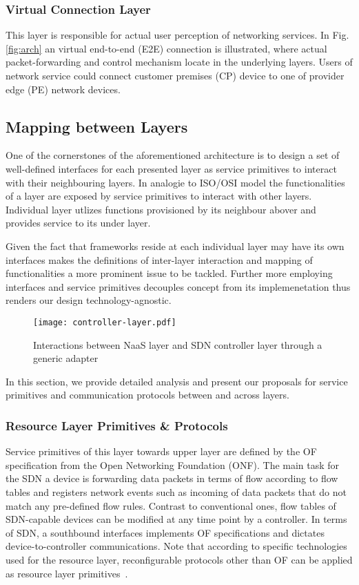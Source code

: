\subsubsection{Virtual Connection Layer} This layer is responsible for actual
user perception of networking services. In Fig.\ref{fig:arch} an virtual
end-to-end (E2E) connection is illustrated, where actual packet-forwarding and
control mechanism locate in the underlying layers. Users of network service
could connect customer premises (CP) device to one of provider edge (PE) network 
devices.


\subsection{Mapping between Layers}


One of the cornerstones of the aforementioned architecture is to design a set
of well-defined interfaces for each presented layer as service primitives to
interact with their neighbouring layers. In analogie to ISO/OSI model the
functionalities of a layer are exposed by service primitives to interact with
other layers. Individual layer utlizes functions provisioned by its neighbour
abover and provides service to its under layer.

Given the fact that frameworks reside at each individual layer may have its own
interfaces makes the definitions of inter-layer interaction and mapping of
functionalities a more prominent issue to be tackled. Further more employing interfaces 
and service primitives decouples concept from its implemenetation thus renders our 
design technology-agnostic. 

\begin{figure}[htp]
	\texttt{[image: controller-layer.pdf]}
	\label{fig:controller-layer}
	\caption{Interactions between NaaS layer and SDN controller layer through a generic adapter}
\end{figure}


In this section, we provide detailed analysis and present our proposals for
service primitives and communication protocols between and across layers.

\subsubsection{Resource Layer Primitives \& Protocols} Service primitives of
this layer towards upper layer are defined by the OF specification from the
Open Networking Foundation (ONF). The main task for the SDN a device is
forwarding data packets in terms of flow according to flow tables and registers
network events such as incoming of data packets that do not match any
pre-defined flow rules. Contrast to conventional ones, flow tables of
SDN-capable devices can be modified at any time point by a controller. In terms
of SDN, a southbound interfaces implements OF specifications and dictates
device-to-controller communications. Note that according to specific
technologies used for the resource layer, reconfigurable protocols other than
OF can be applied as resource layer primitives~\cite{first2013}.

